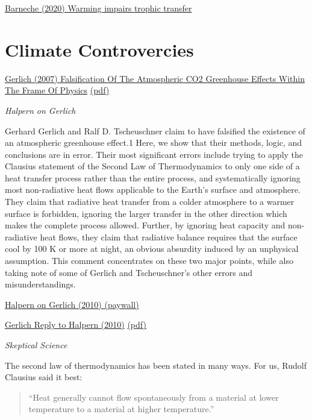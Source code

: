 \documentclass[
]{book}
\begin{document}
\href{https://www.nature.com/articles/s41586-021-03352-2.epdf?sharing_token=en8G_PplC0NZ0bhBexd-sNRgN0jAjWel9jnR3ZoTv0Ocz1xjDcPWe-XYsQ6aAwENGLYkqI0ZtDZNzNTVzQDqzZn-V1IKe1zVtdJyDa_OeTOMHVBxxTmAVAdf8C0XWZFeT5VbXvvLwC4vezF-pqJafKF8PZc0_EjTPOG1MccecjM\%3D}{Barneche (2020) Warming impairs trophic transfer}

\hypertarget{climate-controvercies}{%
\chapter{Climate Controvercies}\label{climate-controvercies}}

\href{https://arxiv.org/abs/0707.1161v3}{Gerlich (2007) Falsification Of The Atmospheric CO2 Greenhouse Effects Within The Frame Of Physics}
\href{pdf/Gerlich_2007_Falsification_Greenhouse.pdf}{(pdf)}

\emph{Halpern on Gerlich}

Gerhard Gerlich and Ralf D. Tscheuschner claim to have falsified the existence of an atmospheric greenhouse effect.1 Here, we show that their methods, logic, and conclusions are in error. Their most significant errors include trying to apply the Clausius statement of the Second Law of Thermodynamics to only one side of a heat transfer process rather than the entire process, and systematically ignoring most non-radiative heat flows applicable to the Earth's surface and atmosphere. They claim that radiative heat transfer from a colder atmosphere to a warmer surface is forbidden, ignoring the larger transfer in the other direction which makes the complete process allowed. Further, by ignoring heat capacity and non-radiative heat flows, they claim that radiative balance requires that the surface cool by 100 K or more at night, an obvious absurdity induced by an unphysical assumption. This comment concentrates on these two major points, while also taking note of some of Gerlich and Tscheuschner's other errors and misunderstandings.

\href{https://ui.adsabs.harvard.edu/abs/2010IJMPB..24.1309H/abstract}{Halpern on Gerlich (2010) (paywall)}

\href{https://arxiv.org/abs/1012.0421}{Gerlich Reply to Halpern (2010)}
\href{pdf/Gerlich_2007_Falsification_Greenhouse_reply_to_Halpern.pdf}{(pdf)}

\emph{Skeptical Science}

The second law of thermodynamics has been stated in many ways. For us, Rudolf Clausius said it best:

\begin{quote}
``Heat generally cannot flow spontaneously from a material at lower temperature to a material at higher temperature.''
\end{quote}
\end{document}

